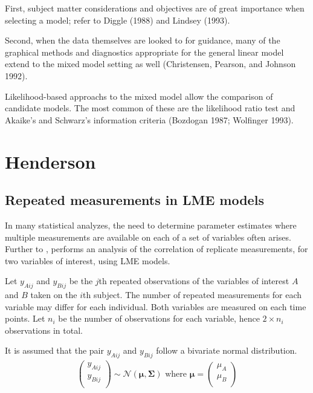 \documentclass[12pt, a4paper]{report}
\theoremstyle{plain}
\theoremstyle{definition}
\theoremstyle{remark}
\begin{document}
First, subject matter considerations and objectives are of great
importance when selecting a model; refer to Diggle (1988) and
Lindsey (1993).

Second, when the data themselves are looked to for guidance, many
of the graphical methods and diagnostics appropriate for the
general linear model extend to the mixed model setting as well
(Christensen, Pearson, and Johnson 1992).

Likelihood-based approachs to the mixed model allow the comparison
of candidate models. The most common of these are the likelihood
ratio test and Akaike's and Schwarz's information criteria
(Bozdogan 1987; Wolfinger 1993).



\chapter{Henderson}




\section{Repeated measurements in LME models}

In many statistical analyzes, the need to determine parameter estimates where multiple measurements are available on each of a set of variables often arises. Further to \citet{lam}, \citet{hamlett} performs an analysis of the correlation of replicate measurements, for two variables of interest, using LME models.

Let $y_{Aij}$ and $y_{Bij}$ be the $j$th repeated observations of the variables of interest $A$ and $B$ taken on the $i$th subject. The number of repeated measurements for each variable may differ for each individual.
Both variables are measured on each time points. Let $n_{i}$ be the number of observations for each variable, hence $2\times n_{i}$ observations in total.

It is assumed that the pair $y_{Aij}$ and $y_{Bij}$ follow a bivariate normal distribution.
\begin{eqnarray*}
	\left(
	\begin{array}{c}
		y_{Aij} \\
		y_{Bij} \\
	\end{array}
	\right) \sim \mathcal{N}(
	\boldsymbol{\mu}, \boldsymbol{\Sigma})\mbox{   where } \boldsymbol{\mu} = \left(
	\begin{array}{c}
		\mu_{A} \\
		\mu_{B} \\
	\end{array}
	\right)
\end{eqnarray*}
\end{document}

